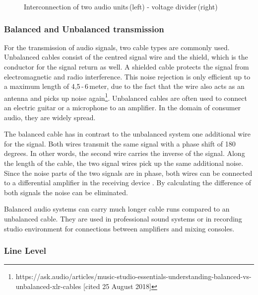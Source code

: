 \begin{figure}[H]
	\centering 
	\caption[VoltageMatching]{Interconnection of two audio units\,(left) - voltage divider\,(right)\footnotemark}
	\label{fig:VoltageMatching}
\end{figure}

\subsubsection{Balanced and Unbalanced transmission}

For the transmission of audio signals, two cable types are commonly used.
Unbalanced cables consist of the centred signal wire and the shield, which is the conductor for the signal return as well.
A shielded cable protects the signal from electromagnetic and radio interference.
This noise rejection is only efficient up to a maximum length of 4,5\,-\,6\,meter, due to the fact that
the wire also acts as an antenna and picks up noise again\footnote{https://ask.audio/articles/music-studio-essentials-understanding-balanced-vs-unbalanced-xlr-cables [cited 25 August 2018]}.
Unbalanced cables are often used to connect an electric guitar or a microphone to an amplifier.
In the domain of consumer audio, they are widely spread.

 
The balanced cable has in contrast to the unbalanced system one additional wire for the signal.
Both wires transmit the same signal with a phase shift of 180 degrees.
In other words, the second wire carries the inverse of the signal.
Along the length of the cable, the two signal wires pick up the same additional noise.
Since the noise parts of the two signals are in phase, both wires can be connected to a differential
amplifier in the receiving device \cite[p.\,490]{Dickreiter:2014}. By calculating the difference of both signals the noise can be eliminated.

Balanced audio systems can carry much longer cable runs compared to an unbalanced cable.
They are used in professional sound systems or in recording studio environment for connections between
amplifiers and mixing consoles.



\subsubsection{Line Level}\label{cap:TheoryLineLevel}

